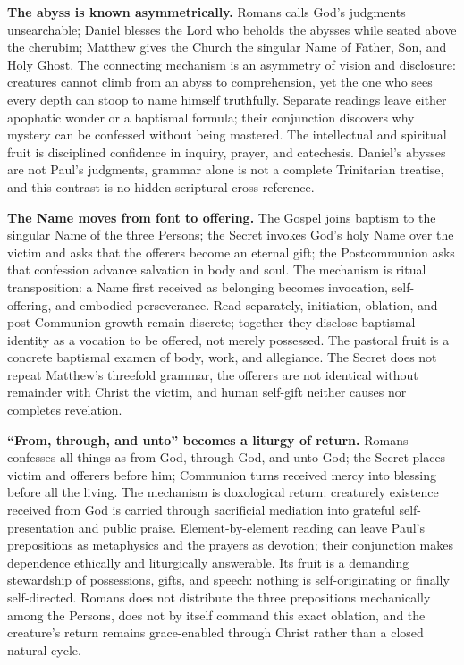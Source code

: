 \noindent\textbf{The abyss is known asymmetrically.\enspace{}}
Romans calls God's judgments unsearchable; Daniel blesses the Lord who beholds the abysses while seated above the cherubim; Matthew gives the Church the singular Name of Father, Son, and Holy Ghost. The connecting mechanism is an asymmetry of vision and disclosure: creatures cannot climb from an abyss to comprehension, yet the one who sees every depth can stoop to name himself truthfully. Separate readings leave either apophatic wonder or a baptismal formula; their conjunction discovers why mystery can be confessed without being mastered. The intellectual and spiritual fruit is disciplined confidence in inquiry, prayer, and catechesis. Daniel's abysses are not Paul's judgments, grammar alone is not a complete Trinitarian treatise, and this contrast is no hidden scriptural cross-reference.

\noindent\textbf{The Name moves from font to offering.\enspace{}}
The Gospel joins baptism to the singular Name of the three Persons; the Secret invokes God's holy Name over the victim and asks that the offerers become an eternal gift; the Postcommunion asks that confession advance salvation in body and soul. The mechanism is ritual transposition: a Name first received as belonging becomes invocation, self-offering, and embodied perseverance. Read separately, initiation, oblation, and post-Communion growth remain discrete; together they disclose baptismal identity as a vocation to be offered, not merely possessed. The pastoral fruit is a concrete baptismal examen of body, work, and allegiance. The Secret does not repeat Matthew's threefold grammar, the offerers are not identical without remainder with Christ the victim, and human self-gift neither causes nor completes revelation.

\noindent\textbf{``From, through, and unto'' becomes a liturgy of return.\enspace{}}
Romans confesses all things as from God, through God, and unto God; the Secret places victim and offerers before him; Communion turns received mercy into blessing before all the living. The mechanism is doxological return: creaturely existence received from God is carried through sacrificial mediation into grateful self-presentation and public praise. Element-by-element reading can leave Paul's prepositions as metaphysics and the prayers as devotion; their conjunction makes dependence ethically and liturgically answerable. Its fruit is a demanding stewardship of possessions, gifts, and speech: nothing is self-originating or finally self-directed. Romans does not distribute the three prepositions mechanically among the Persons, does not by itself command this exact oblation, and the creature's return remains grace-enabled through Christ rather than a closed natural cycle.

